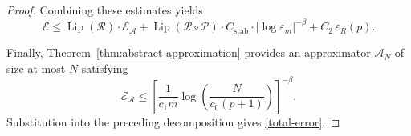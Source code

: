 \documentclass[10pt,a4paper]{amsart}
\newcommand{\Lip}{\operatorname{Lip}}
\begin{document}
\begin{proof}
		Combining these estimates yields
		\begin{equation*}
			\mathscr{E}
			\leq
			\Lip(\mathcal{R})\cdot \mathscr{E}_{\mathcal{A}}
			+
			\Lip(\mathcal{R}\circ\mathcal{P})\cdot C_{\mathrm{stab}}\cdot |\log \varepsilon_m|^{-\beta}
			+
			C_2\,\varepsilon_R(p).
		\end{equation*}
		
		Finally, Theorem~\ref{thm:abstract-approximation} provides an approximator $\mathcal A_N$ of size at most $N$ satisfying
		\begin{equation*}
			\mathscr E_{\mathcal A}
			\le
			\left[
			\frac{1}{c_1m}
			\log\!\left(\frac{N}{c_0(p+1)}\right)
			\right]^{-\beta}.
		\end{equation*}
		Substitution into the preceding decomposition gives \eqref{total-error}.
	\end{proof}
\end{document}

